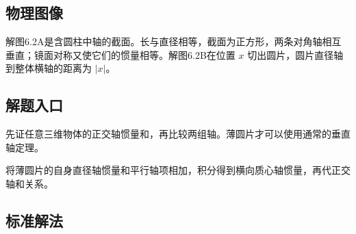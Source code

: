 \documentclass[UTF8,fontset=fandol,a4paper,11pt]{ctexart}
\begin{document}


\subsection*{物理图像}

解图6.2A是含圆柱中轴的截面。长与直径相等，截面为正方形，两条对角轴相互垂直；镜面对称又使它们的惯量相等。解图6.2B在位置 $x$ 切出圆片，圆片直径轴到整体横轴的距离为 $|x|$。



\subsection*{解题入口}

先证任意三维物体的正交轴惯量和，再比较两组轴。薄圆片才可以使用通常的垂直轴定理。

将薄圆片的自身直径轴惯量和平行轴项相加，积分得到横向质心轴惯量，再代正交轴和关系。



\subsection*{标准解法}
\end{document}
